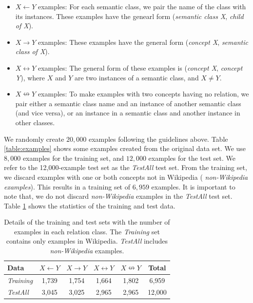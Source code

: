 \begin{itemize}
\item $X \leftarrow Y$ examples: For each semantic class, we pair the
  name of the class with its instances. These examples have the
  genearl form ({\em semantic class X}, {\em child of X}).
\item $X \rightarrow Y$ examples: These examples have the general form
  ({\em concept X}, {\em semantic class of X}).
\item $X \leftrightarrow Y$ examples: The general form of these
  examples is ({\em concept X}, {\em concept Y}), where $X$ and $Y$
  are two instances of a semantic class, and $X \ne Y$.
\item $X \nleftrightarrow Y$ examples: To make examples with two
  concepts having no relation, we pair either a semantic class name
  and an instance of another semantic class (and vice versa), or an
  instance in a semantic class and another instance in other classes.
\end{itemize}


We randomly create $20,000$ examples following the guidelines
above. Table \ref{table:examples} shows some examples created from the
original data set. We use $8,000$ examples for the training set, and
$12,000$ examples for the test set. We refer to the 12,000-example
test set as the {\em TestAll} test set. From the training set, we
discard examples with one or both concepts not in Wikipedia ({\em
  non-Wikipedia examples}). This results in a training set of $6,959$
examples.  It is important to note that, we do not discard {\em
  non-Wikipedia} examples in the {\em TestAll} test set. Table
\ref{tab:detail-dataset} shows the statistics of the training and
test data.

\begin{table}[!t]
  \small
  \begin{center}
    \begin{tabular}{|l||c|c|c|c|c|}
      \hline
      Data & $X \leftarrow Y$ & $X \rightarrow Y$  & $X \leftrightarrow Y$  & $X \nleftrightarrow Y$ & Total \\
      \hline
      \hline
      {\em Training}  & 1,739 & 1,754 & 1,664 & 1,802 & 6,959\\
      {\em TestAll} & 3,045 & 3,025 & 2,965 & 2,965 & 12,000 \\
      \hline
    \end{tabular}
    \caption{Details of the training and test sets with the number of
      examples in each relation class. The {\em Training} set contains
      only examples in Wikipedia. {\em TestAll} includes {\em
        non-Wikipedia} examples.}
    \label{tab:detail-dataset}
  \end{center}
\end{table}

